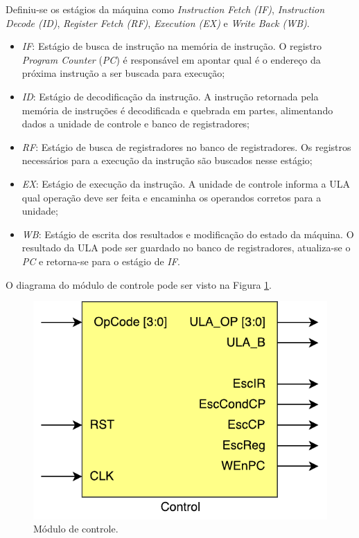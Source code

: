 \documentclass[11pt,a4paper,titlepage]{article}
\begin{document}
Definiu-se os estágios da máquina como \textit{Instruction Fetch (IF)}, \textit{Instruction Decode (ID)}, \textit{Register Fetch (RF)}, \textit{Execution (EX)} e \textit{Write Back (WB)}.

\begin{itemize}
\item \textit{IF}: Estágio de busca de instrução na memória de instrução. O registro \textit{Program Counter} (\textit{PC}) é responsável em apontar qual é o endereço da próxima instrução a ser buscada para execução;
\item \textit{ID}: Estágio de decodificação da instrução. A instrução retornada pela memória de instruções é decodificada e quebrada em partes, alimentando dados a unidade de controle e banco de registradores;
\item \textit{RF}: Estágio de busca de registradores no banco de registradores. Os registros necessários para a execução da instrução são buscados nesse estágio;
\item \textit{EX}: Estágio de execução da instrução. A unidade de controle informa a ULA qual operação deve ser feita e encaminha os operandos corretos para a unidade;
\item \textit{WB}: Estágio de escrita dos resultados e modificação do estado da máquina. O resultado da ULA pode ser guardado no banco de registradores, atualiza-se o \textit{PC} e retorna-se para o estágio de \textit{IF}.
\end{itemize}

O diagrama do módulo de controle pode ser visto na Figura \ref{fig:control}.

\begin{figure}[!h]
\centering
\includegraphics[scale=0.5]{images/Control.pdf}
\caption{Módulo de controle.}
\label{fig:control}
\end{figure}
\end{document}
